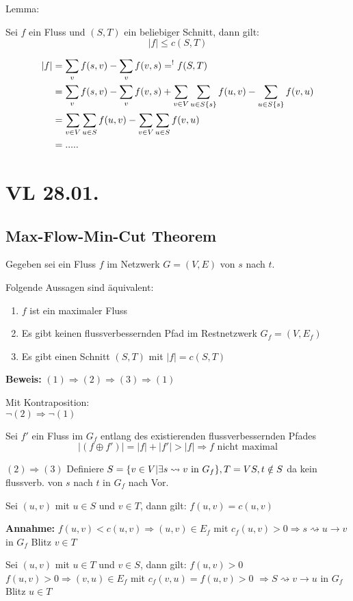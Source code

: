 \documentclass[a4paper,draft,twoside,10pt]{report}
\begin{document}
Lemma:

Sei $f$ ein Fluss und $(S,T)$ ein beliebiger Schnitt, dann gilt:
\[|f|\le c(S,T)\]

\begin{align*}
|f|&= \sum_v f(s,v)-\sum_v f(v,s)=^! f(S,T)\\
&=\sum_v f(s,v)-\sum_v f(v,s) + \sum_{v\in V}\sum_{u\in S\/\{s\}}f(u,v)-\sum_{u\in S\/\{s\}} f(v,u)\\
&=\sum_{v\in V}\sum_{u\in S}f(u,v)-\sum_{v\in V}\sum_{u\in S}f(v,u)\\
&=.....
\end{align*}

\chapter{VL 28.01.}

\section{Max-Flow-Min-Cut Theorem}
Gegeben sei ein Fluss $f$ im Netzwerk $G=(V,E)$ von $s$ nach $t$.

Folgende Aussagen sind äquivalent:
\begin{enumerate}
\item $f$ ist ein maximaler Fluss
\item Es gibt keinen flussverbessernden Pfad im Restnetzwerk $G_f=(V,E_f)$
\item Es gibt einen Schnitt $(S,T)$ mit $|f|=c(S,T)$
\end{enumerate}
\textbf{Beweis:} $(1)\Rightarrow (2)\Rightarrow(3)\Rightarrow(1)$

Mit Kontraposition:\\
$\neg (2)\Rightarrow \neg (1)$

Sei $f'$ ein Fluss im $G_f$ entlang des existierenden flussverbessernden Pfades
\[|(f\oplus f')|=|f|+|f'| > |f|\Rightarrow f \mbox{ nicht maximal}\]

$(2)\Rightarrow (3)$
Definiere $S=\{v\in V | \exists s \rightsquigarrow v \mbox{ in } G_f\},T=V\/S, t\notin S$ da kein flussverb. von $s$ nach $t$ in $G_f$ nach Vor.

Sei $(u,v)$ mit $u\in S$ und $v\in T$, dann gilt: $f(u,v) =c(u,v)$

\textbf{Annahme:} $f(u,v)<c(u,v)\Rightarrow (u,v) \in E_f$ mit $c_f(u,v)>0 \Rightarrow s\rightsquigarrow u\rightarrow v$ in $G_f$ Blitz $v\in T$

Sei $(u,v)$ mit $u\in T$ und $v \in S$, dann gilt: $f(u,v)>0$
$f(u,v)>0 \Rightarrow (v,u) \in E_f$ mit $c_f (v,u) =f(u,v)>0$
$\Rightarrow S\rightsquigarrow v\rightarrow u$ in $G_f$ Blitz $u\in T$
\end{document}
